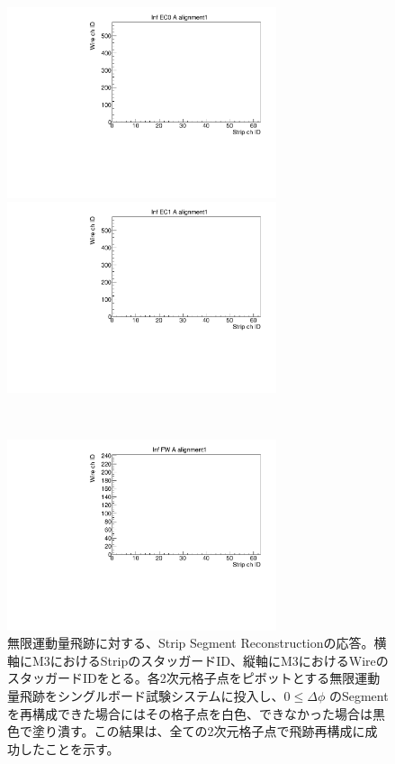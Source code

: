 \begin{figure}
    \begin{minipage}[b]{.5\linewidth}
        \centering
        \includegraphics[height=5.6cm]{fig/Test/A_InfEC0_strip.pdf}
    \end{minipage}
    \begin{minipage}[b]{.5\linewidth}
        \centering
        \includegraphics[height=5.6cm]{fig/Test/A_InfEC1_strip.pdf}
    \end{minipage}\\
    \begin{minipage}[b]{\linewidth}
        \centering
        \includegraphics[height=5.6cm]{fig/Test/A_InfFW_strip.pdf}
    \end{minipage}
    \caption[無限運動量飛跡に対する、Strip Segment Reconstructionの応答]{無限運動量飛跡に対する、Strip Segment Reconstructionの応答。横軸にM3におけるStripのスタッガードID、縦軸にM3におけるWireのスタッガードIDをとる。各2次元格子点をピボットとする無限運動量飛跡をシングルボード試験システムに投入し、$0 \leq \Delta\phi$ のSegmentを再構成できた場合にはその格子点を白色、できなかった場合は黒色で塗り潰す。この結果は、全ての2次元格子点で飛跡再構成に成功したことを示す。}
    \label{Inf_A_Strip}
\end{figure}

